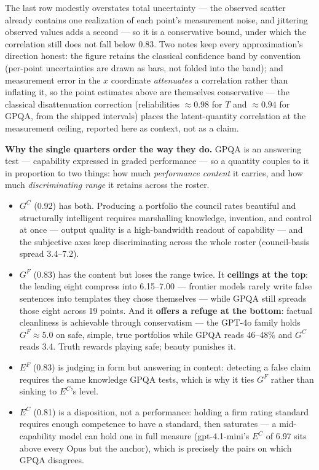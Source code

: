 The last row modestly overstates total uncertainty --- the observed scatter already contains one realization of each point's measurement noise, and jittering observed values adds a second --- so it is a conservative bound, under which the correlation still does not fall below 0.83. Two notes keep every approximation's direction honest: the figure retains the classical confidence band by convention (per-point uncertainties are drawn as bars, not folded into the band); and measurement error in the \(x\) coordinate \emph{attenuates} a correlation rather than inflating it, so the point estimates above are themselves conservative --- the classical disattenuation correction (reliabilities \(\approx 0.98\) for \(T\) and \(\approx 0.94\) for GPQA, from the shipped intervals) places the latent-quantity correlation at the measurement ceiling, reported here as context, not as a claim.

\textbf{Why the single quarters order the way they do.} GPQA is an answering test --- capability expressed in graded performance --- so a quantity couples to it in proportion to two things: how much \emph{performance content} it carries, and how much \emph{discriminating range} it retains across the roster.

\begin{itemize}
\tightlist
\item
  \(G^{C}\) (0.92) has both. Producing a portfolio the council rates beautiful and structurally intelligent requires marshalling knowledge, invention, and control at once --- output quality is a high-bandwidth readout of capability --- and the subjective axes keep discriminating across the whole roster (council-basis spread 3.4--7.2).
\item
  \(G^{F}\) (0.83) has the content but loses the range twice. It \textbf{ceilings at the top}: the leading eight compress into 6.15--7.00 --- frontier models rarely write false sentences into templates they chose themselves --- while GPQA still spreads those eight across 19 points. And it \textbf{offers a refuge at the bottom}: factual cleanliness is achievable through conservatism --- the GPT-4o family holds \(G^{F} \approx 5.0\) on safe, simple, true portfolios while GPQA reads 46--48\% and \(G^{C}\) reads 3.4. Truth rewards playing safe; beauty punishes it.
\item
  \(E^{F}\) (0.83) is judging in form but answering in content: detecting a false claim requires the same knowledge GPQA tests, which is why it ties \(G^{F}\) rather than sinking to \(E^{C}\)'s level.
\item
  \(E^{C}\) (0.81) is a disposition, not a performance: holding a firm rating standard requires enough competence to have a standard, then saturates --- a mid-capability model can hold one in full measure (gpt-4.1-mini's \(E^{C}\) of 6.97 sits above every Opus but the anchor), which is precisely the pairs on which GPQA disagrees.
\end{itemize}

